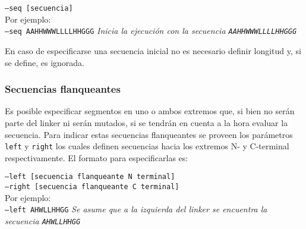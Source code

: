 \indent \texttt{--seq [secuencia]} 
\\Por ejemplo: \\
\begin{adjustbox}{width=\textwidth}
\indent \texttt{--seq AAHHWWWLLLLHHGGG} \hspace{0.5cm} \textit{Inicia la ejecución con la secuencia \texttt{AAHHWWWLLLLHHGGG}}
\end{adjustbox}

En caso de especificarse una secuencia inicial no es necesario definir longitud y, si se define, es ignorada.



\subsubsection{Secuencias flanqueantes}\label{flanqueantes} 

Es posible especificar segmentos en uno o ambos extremos que, si bien no serán parte del linker ni serán mutados, si se tendrán en cuenta a la hora evaluar la secuencia.
Para indicar estas secuencias flanqueantes se proveen los parámetros \texttt{left} y \texttt{right} los cuales definen secuencias hacia los extremos N- y C-terminal respectivamente.
El formato para especificarlas es:


\indent \texttt{--left  [secuencia flanqueante N terminal]} \\
\indent \texttt{--right [secuencia flanqueante C terminal]} 
\\Por ejemplo: \\
\begin{adjustbox}{width=\textwidth}
\indent \texttt{--left AHWLLHHGG} \hspace{0.5cm} \textit{Se asume que a la izquierda del linker se encuentra la secuencia \texttt{AHWLLHHGG}}
\end{adjustbox}




